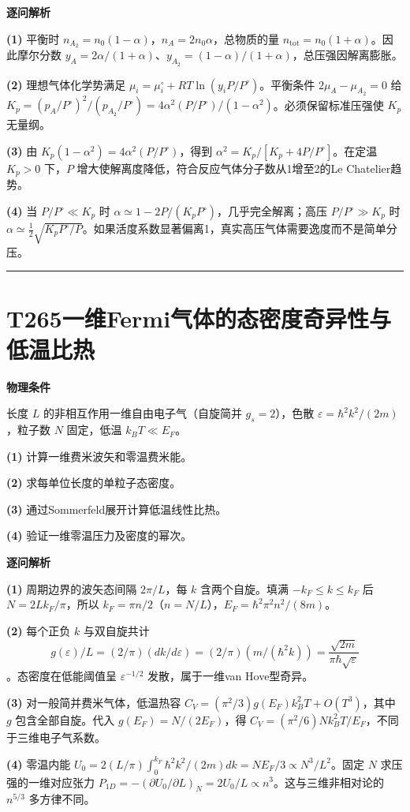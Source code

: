 \documentclass[UTF8,a4paper,11pt,oneside,openany]{ctexbook}
\begin{document}
\par\medskip\noindent\textbf{逐问解析}
\par\noindent\textbf{(1)} 平衡时 \(n_{A_2}=n_0(1-\alpha)\)，\(n_A=2n_0\alpha\)，总物质的量 \(n_{\mathrm{tot}}=n_0(1+\alpha)\)。因此摩尔分数 \(y_A=2\alpha/(1+\alpha)\)、\(y_{A_2}=(1-\alpha)/(1+\alpha)\)，总压强因解离膨胀。
\par\noindent\textbf{(2)} 理想气体化学势满足 \(\mu_i=\mu_i^\circ+RT\ln(y_iP/P^\circ)\)。平衡条件 \(2\mu_A-\mu_{A_2}=0\) 给 \(K_p=(p_A/P^\circ)^2/(p_{A_2}/P^\circ)=4\alpha^2(P/P^\circ)/(1-\alpha^2)\)。必须保留标准压强使 \(K_p\) 无量纲。
\par\noindent\textbf{(3)} 由 \(K_p(1-\alpha^2)=4\alpha^2(P/P^\circ)\)，得到 \(\alpha^2=K_p/[K_p+4P/P^\circ]\)。在定温 \(K_p>0\) 下，\(P\) 增大使解离度降低，符合反应气体分子数从1增至2的Le Chatelier趋势。
\par\noindent\textbf{(4)} 当 \(P/P^\circ\ll K_p\) 时 \(\alpha\simeq1-2P/(K_pP^\circ)\)，几乎完全解离；高压 \(P/P^\circ\gg K_p\) 时 \(\alpha\simeq\tfrac12\sqrt{K_pP^\circ/P}\)。如果活度系数显著偏离1，真实高压气体需要逸度而不是简单分压。

\par\bigskip\hrule\bigskip
\section*{T265\quad 一维Fermi气体的态密度奇异性与低温比热}
\textbf{物理条件}\par 长度 \(L\) 的非相互作用一维自由电子气（自旋简并 \(g_s=2\)），色散 \(\varepsilon=\hbar^2k^2/(2m)\)，粒子数 \(N\) 固定，低温 \(k_BT\ll E_F\)。
\par\noindent\textbf{(1)} 计算一维费米波矢和零温费米能。
\par\noindent\textbf{(2)} 求每单位长度的单粒子态密度。
\par\noindent\textbf{(3)} 通过Sommerfeld展开计算低温线性比热。
\par\noindent\textbf{(4)} 验证一维零温压力及密度的幂次。

\par\medskip\noindent\textbf{逐问解析}
\par\noindent\textbf{(1)} 周期边界的波矢态间隔 \(2\pi/L\)，每 \(k\) 含两个自旋。填满 \(-k_F\le k\le k_F\) 后 \(N=2Lk_F/\pi\)，所以 \(k_F=\pi n/2\)（\(n=N/L\)），\(E_F=\hbar^2\pi^2n^2/(8m)\)。
\par\noindent\textbf{(2)} 每个正负 \(k\) 与双自旋共计 \[g(\varepsilon)/L=(2/\pi)(dk/d\varepsilon)=(2/\pi)(m/(\hbar^2k))=\frac{\sqrt{2m}}{\pi\hbar\sqrt\varepsilon}\]。态密度在低能阈值呈 \(\varepsilon^{-1/2}\) 发散，属于一维van Hove型奇异。
\par\noindent\textbf{(3)} 对一般简并费米气体，低温热容 \(C_V=(\pi^2/3)g(E_F)k_B^2T+O(T^3)\)，其中 \(g\) 包含全部自旋。代入 \(g(E_F)=N/(2E_F)\)，得 \(C_V=(\pi^2/6)Nk_B^2T/E_F\)，不同于三维电子气系数。
\par\noindent\textbf{(4)} 零温内能 \(U_0=2(L/\pi)\int_0^{k_F}\hbar^2k^2/(2m)dk=NE_F/3\propto N^3/L^2\)。固定 \(N\) 求压强的一维对应张力 \(P_{1D}=-(\partial U_0/\partial L)_N=2U_0/L\propto n^3\)。这与三维非相对论的 \(n^{5/3}\) 多方律不同。
\end{document}
